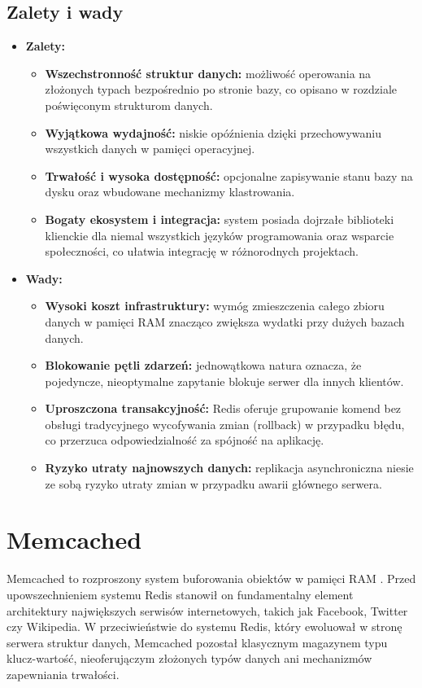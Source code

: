 \subsection{Zalety i wady}
\begin{itemize}
    \item \textbf{Zalety:}
    \begin{itemize}
        \item \textbf{Wszechstronność struktur danych:} możliwość operowania na złożonych typach bezpośrednio po stronie bazy, co opisano w rozdziale poświęconym strukturom danych.
        \item \textbf{Wyjątkowa wydajność:} niskie opóźnienia dzięki przechowywaniu wszystkich danych w pamięci operacyjnej.
        \item \textbf{Trwałość i wysoka dostępność:} opcjonalne zapisywanie stanu bazy na dysku oraz wbudowane mechanizmy klastrowania.
        \item \textbf{Bogaty ekosystem i integracja:} system posiada dojrzałe biblioteki klienckie dla niemal wszystkich języków programowania oraz wsparcie społeczności, co ułatwia integrację w różnorodnych projektach.
    \end{itemize}
    \item \textbf{Wady:}
    \begin{itemize}
        \item \textbf{Wysoki koszt infrastruktury:} wymóg zmieszczenia całego zbioru danych w pamięci RAM znacząco zwiększa wydatki przy dużych bazach danych.
        \item \textbf{Blokowanie pętli zdarzeń:} jednowątkowa natura oznacza, że pojedyncze, nieoptymalne zapytanie blokuje serwer dla innych klientów.
        \item \textbf{Uproszczona transakcyjność:} Redis oferuje grupowanie komend bez obsługi tradycyjnego wycofywania zmian (rollback) w przypadku błędu, co przerzuca odpowiedzialność za spójność na aplikację.
        \item \textbf{Ryzyko utraty najnowszych danych:} replikacja asynchroniczna niesie ze sobą ryzyko utraty zmian w przypadku awarii głównego serwera.
    \end{itemize}
\end{itemize}

\section{Memcached}
Memcached to rozproszony system buforowania obiektów w pamięci RAM \cite{fitzpatrick2004}. Przed upowszechnieniem systemu Redis stanowił on fundamentalny element architektury największych serwisów internetowych, takich jak Facebook, Twitter czy Wikipedia.
W przeciwieństwie do systemu Redis, który ewoluował w stronę serwera struktur danych, Memcached pozostał klasycznym magazynem typu klucz-wartość, nieoferujączym złożonych typów danych ani mechanizmów zapewniania trwałości.
